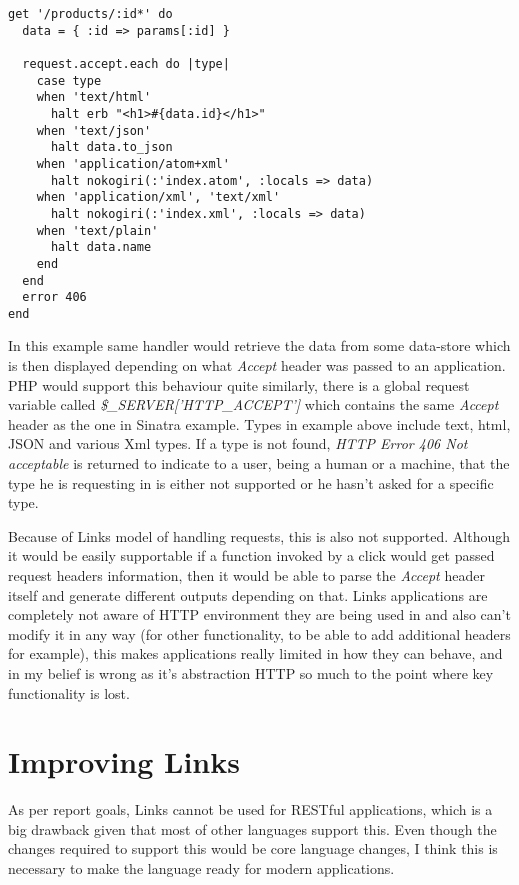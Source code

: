 \begin{codelisting}
\begin{verbatim}
get '/products/:id*' do
  data = { :id => params[:id] }

  request.accept.each do |type|
    case type
    when 'text/html'
      halt erb "<h1>#{data.id}</h1>"
    when 'text/json'
      halt data.to_json
    when 'application/atom+xml'
      halt nokogiri(:'index.atom', :locals => data)
    when 'application/xml', 'text/xml'
      halt nokogiri(:'index.xml', :locals => data)
    when 'text/plain'
      halt data.name
    end
  end
  error 406
end
\end{verbatim}
\end{codelisting}

In this example same handler would retrieve the data from some data-store which is then displayed depending on what \textit{Accept} header was passed to an application. PHP would support this behaviour quite similarly, there is a global request variable called \textit{\$\_SERVER['HTTP\_ACCEPT']} which contains the same \textit{Accept} header as the one in Sinatra example. Types in example above include text, html, JSON and various Xml types. If a type is not found, \textit{HTTP Error 406 Not acceptable} is returned to indicate to a user, being a human or a machine, that the type he is requesting in is either not supported or he hasn't asked for a specific type. 

Because of Links model of handling requests, this is also not supported. Although it would be easily supportable if a function invoked by a click would get passed request headers information, then it would be able to parse the \textit{Accept} header itself and generate different outputs depending on that. Links applications are completely not aware of HTTP environment they are being used in and also can't modify it in any way (for other functionality, to be able to add additional headers for example), this makes applications really limited in how they can behave, and in my belief is wrong as it's abstraction HTTP so much to the point where key functionality is lost. 

\section{Improving Links}

As per report goals, Links cannot be used for RESTful applications, which is a big drawback given that most of other languages support this. Even though the changes required to support this would be core language changes, I think this is necessary to make the language ready for modern applications. 

